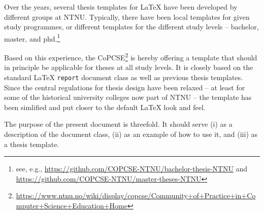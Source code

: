 \noindent Over the years, several thesis templates for \LaTeX{} have been developed by different groups at NTNU. Typically, there have been local templates for given study programmes, or different templates for the different study levels – bachelor, master, and \acrshort{phd}.\footnote{see, e.g., \url{https://github.com/COPCSE-NTNU/bachelor-thesis-NTNU} and \url{https://github.com/COPCSE-NTNU/master-theses-NTNU}}

Based on this experience, the \acrfull{CoPCSE}\footnote{\url{https://www.ntnu.no/wiki/display/copcse/Community+of+Practice+in+Computer+Science+Education+Home}} is hereby offering a template that should in principle be applicable for theses at all study levels. It is closely based on the standard \LaTeX{} \texttt{report} document class as well as previous thesis templates. Since the central regulations for thesis design have been relaxed – at least for some of the historical university colleges now part of NTNU – the template has been simlified and put closer to the default \LaTeX{} look and feel.

The purpose of the present document is threefold. It should serve (i) as a description of the document class, (ii) as an example of how to use it, and (iii) as a thesis template.
